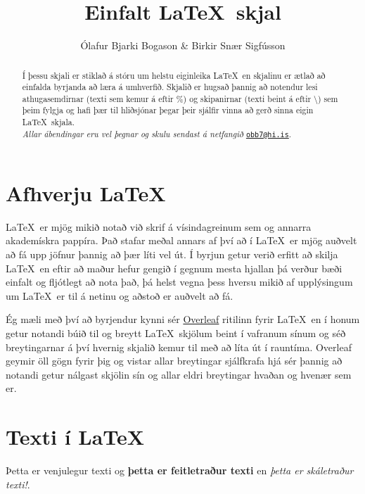 \documentclass[a4paper]{article}
\title{Einfalt \LaTeX\ skjal}	%
\author{Ólafur Bjarki Bogason \& Birkir Snær Sigfússon}				%
\begin{document}
\maketitle

\begin{abstract}	%
	Í þessu skjali er stiklað á stóru um helstu eiginleika \LaTeX\ en skjalinu er ætlað að einfalda byrjanda að læra á umhverfið. Skjalið er hugsað þannig að notendur lesi athugasemdirnar (texti sem kemur á eftir \%) og skipanirnar (texti beint á eftir \textbackslash) sem þeim fylgja og hafi þær til hliðsjónar þegar þeir sjálfir vinna að gerð sinna eigin \LaTeX\ skjala. \\

\noindent \textit{Allar ábendingar eru vel þegnar og skulu sendast á netfangið } \href{mailto:obb7@hi.is}{\nolinkurl{obb7@hi.is}}. 
\end{abstract}

\tableofcontents

\listoffigures


\section{Afhverju \LaTeX}
\LaTeX\ er mjög mikið notað við skrif á vísindagreinum sem og annarra akademískra pappíra. Það stafar meðal annars af því að í \LaTeX\ er mjög auðvelt að fá upp jöfnur þannig að þær líti vel út. Í byrjun getur verið erfitt að skilja \LaTeX\ en eftir að maður hefur gengið í gegnum mesta hjallan þá verður bæði einfalt og fljótlegt að nota það, þá helst vegna þess hversu mikið af upplýsingum um \LaTeX\ er til á netinu og aðstoð er auðvelt að fá.

Ég mæli með því að byrjendur kynni sér \href{https://www.overleaf.com}{Overleaf} ritilinn fyrir \LaTeX\ en í honum getur notandi búið til og breytt \LaTeX\ skjölum beint í vafranum sínum og séð breytingarnar á því hvernig skjalið kemur til með að líta út í rauntíma. Overleaf geymir öll gögn fyrir þig og vistar allar breytingar sjálfkrafa hjá sér þannig að notandi getur nálgast skjölin sín og allar eldri breytingar hvaðan og hvenær sem er.

\section{Texti í \LaTeX}
Þetta er venjulegur texti og \textbf{þetta er feitletraður texti} en \textit{þetta er skáletraður texti!}.
\end{document}
